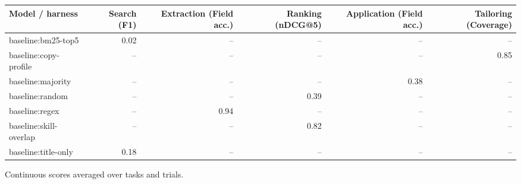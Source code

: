 {\small
\begin{adjustbox}{max width=\linewidth}
\begin{tabular}{lrrrrr}
\toprule
Model / harness & Search (F1) & Extraction (Field acc.) & Ranking (nDCG@5) & Application (Field acc.) & Tailoring (Coverage) \\
\midrule
baseline:bm25-top5 & 0.02 & -- & -- & -- & -- \\
baseline:copy-profile & -- & -- & -- & -- & 0.85 \\
baseline:majority & -- & -- & -- & 0.38 & -- \\
baseline:random & -- & -- & 0.39 & -- & -- \\
baseline:regex & -- & 0.94 & -- & -- & -- \\
baseline:skill-overlap & -- & -- & 0.82 & -- & -- \\
baseline:title-only & 0.18 & -- & -- & -- & -- \\
\bottomrule
\end{tabular}
\end{adjustbox}

\smallskip
{\footnotesize Continuous scores averaged over tasks and trials.\par}
}
